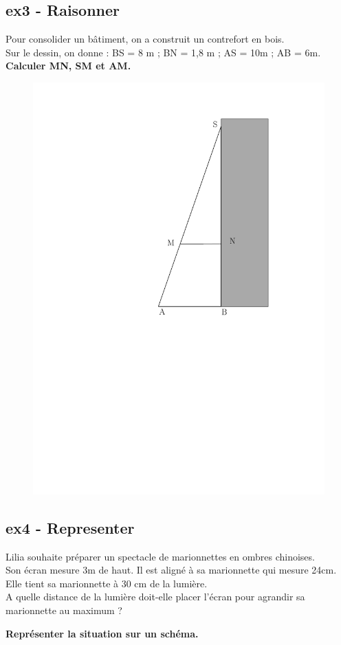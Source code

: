 \documentclass[12pt]{article}
\begin{document}
\begin{multicols}{3}
  \subsection*{ex3 - Raisonner}
  Pour consolider un bâtiment, on a construit un contrefort en bois. \\
  Sur le dessin, on donne : BS = 8 m ; BN = 1,8 m ; AS = 10m ; AB = 6m.\\
  \textbf{Calculer MN, SM et AM.}
  \begin{figure}[H]
    \centering
    \includegraphics[width=.5\linewidth]{4x6-thales/sources/mur.pdf}
  \end{figure}


  \subsection*{ex4 - Representer}
  Lilia souhaite préparer un spectacle de marionnettes en ombres chinoises. \\
  Son écran mesure 3m de haut. Il est aligné à sa marionnette qui mesure 24cm.
  Elle tient sa marionnette à 30 cm de la lumière.\\
  A quelle distance de la lumière doit-elle placer l’écran pour agrandir sa marionnette au maximum ?

  \textbf{Représenter la situation sur un schéma.}
\end{multicols}
\end{document}
